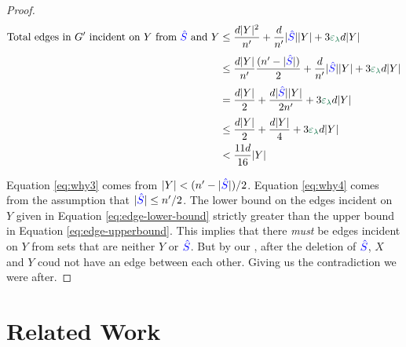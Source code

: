\documentclass[11pt]{article}
\begin{document}
\begin{proof}
\begin{align}
 \text{Total edges in $\RemGraph$ incident on $Y$ from $\BadSet$ and $Y$} &\leq \frac{d\Size{Y}^2}{\SizeRemGraph} +   \frac{d}{\SizeRemGraph}\Size{\BadSet}\Size{Y} + 3\epsilonL d\Size{Y}\\[3pt]                                                                          &\leq  \frac{d\Size{Y}}{\SizeRemGraph}\frac{(\SizeRemGraph - \Size{\BadSet})}{2} + \frac{d}{\SizeRemGraph}\Size{\BadSet}\Size{Y} + 3\epsilonL d\Size{Y} \label{eq:why3}\\[3pt]
                                                                          &= \frac{d\Size{Y}}{2} + \frac{d\Size{\BadSet}\Size{Y}}{2\SizeRemGraph} +3\epsilonL d\Size{Y}\\[3pt]
                                                                          &\leq \frac{d\Size{Y}}{2} + \frac{d\Size{Y}}{4} +3\epsilonL d\Size{Y}  \label{eq:why4}\\
                                                                            &< \frac{11d}{16}\Size{Y} \label{eq:edge-upperbound}
\end{align}

Equation \eqref{eq:why3} comes from  $|Y| < (n' - |\textcolor{blue}{\hat{S}}|)/2$.
Equation \eqref{eq:why4} comes from the assumption that $|\textcolor{blue}{\hat{S}}| \leq n'/2$.
The lower bound on the edges incident on $Y$ given in Equation \eqref{eq:edge-lower-bound} strictly greater than the upper bound in Equation \eqref{eq:edge-upperbound}.
This implies that there \emph{must} be edges incident on $Y$ from sets that are neither $Y$ or $\textcolor{blue}{\hat{S}}$.
But by our , after the deletion of $\textcolor{blue}{\hat{S}}$, $X$ and $Y$ coud not have an edge between each other.
Giving us the contradiction we were after.

\end{proof}

\section{Related Work}
\label{sec:related-work}



\clearpage
\appendix
\end{document}
